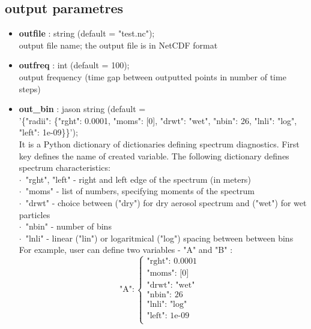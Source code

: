\documentclass[11pt]{article}
\begin{document}
\subsection{output parametres}\label{sec:output}

\begin{itemize}
  \item \textbf{outfile} : string (default = "test.nc"); \\ output file name; the output file is in NetCDF format
  \item \textbf{outfreq} : int (default = 100); \\ output frequency (time gap between outputted points in number of time steps)
  \item \textbf{out\_bin} : jason string (default =\\ '\{"radii": \{"rght": 0.0001, "moms": [0], "drwt": "wet", "nbin": 26, "lnli": "log", "left": 1e-09\}\}');\\

    \vspace{-.9em}
    It is a Python dictionary of dictionaries defining spectrum diagnostics.
    First key defines the name of created variable. The following dictionary defines spectrum characteristics:\\
      \indent $\cdot$\ "rght", "left" - right and left edge of the spectrum (in meters)\\
      \indent $\cdot$\ "moms" - list of numbers, specifying moments of the spectrum\\
      \indent $\cdot$\ "drwt" - choice between  ("dry") for dry aerosol spectrum and ("wet") for wet particles\\
      \indent $\cdot$\ "nbin" - number of bins\\
      \indent $\cdot$\ "lnli" - linear ("lin") or logaritmical ("log") spacing between between bins\\
 
    \vspace{-.9em}
    For example, user can define two variables - "A" and "B" : \\ 
  
$$
\mbox{"A"}: \left\{ \begin{array}{ll}
\mbox{"rght": 0.0001}  & \textrm{}\\
\mbox{"moms": [0]}  & \textrm{}\\
\mbox{"drwt": "wet"} & \textrm{}\\
\mbox{"nbin": 26} & \textrm{}\\
\mbox{"lnli": "log"}  & \textrm{}\\
\mbox{"left": 1e-09} & \textrm{}\\
\end{array} \right.
$$


\end{itemize}
\end{document}
